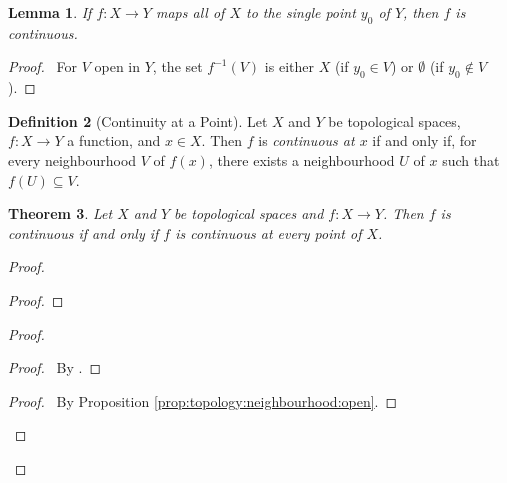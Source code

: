 \documentclass{report}
\let\qed\relax
\newtheorem{lm}{Lemma}[section]
\newtheorem{thm}[lm]{Theorem}
\theoremstyle{definition}
\newtheorem{df}[lm]{Definition}
\begin{document}
  \begin{lm}
    \label{lm:topology:continuous:constant}
    If $f : X \rightarrow Y$ maps all of $X$ to the single point $y_0$ of $Y$,
    then $f$ is continuous.
  \end{lm}

  \begin{proof}
    \pf\ For $V$ open in $Y$, the set $f^{-1}(V)$ is either $X$ (if $y_0 \in
    V$) or $\emptyset$ (if $y_0 \notin V$).
  \end{proof}

  \begin{df}[Continuity at a Point]
    Let $X$ and $Y$ be topological spaces, $f : X \rightarrow Y$ a function,
    and
    $x \in X$. Then $f$ is \emph{continuous at $x$} if and only if, for every
    neighbourhood $V$ of $f(x)$, there exists a neighbourhood $U$ of $x$ such
    that
    $f(U) \subseteq V$.
  \end{df}

  \begin{thm}
    \label{thm:topology:continuous:at_every_point}
    Let $X$ and $Y$ be topological spaces and $f : X \rightarrow Y$. Then $f$
    is
    continuous if and only if $f$ is continuous at every point of $X$.
  \end{thm}

  \begin{proof}
    \pf
    \begin{proof}
    \end{proof}
    \begin{proof}
      \begin{proof}
        \pf\ By .
      \end{proof}
      \qedstep
      \begin{proof}
        \pf\ By Proposition \ref{prop:topology:neighbourhood:open}.
      \end{proof}
    \end{proof}
    \qed
  \end{proof}
\end{document}
